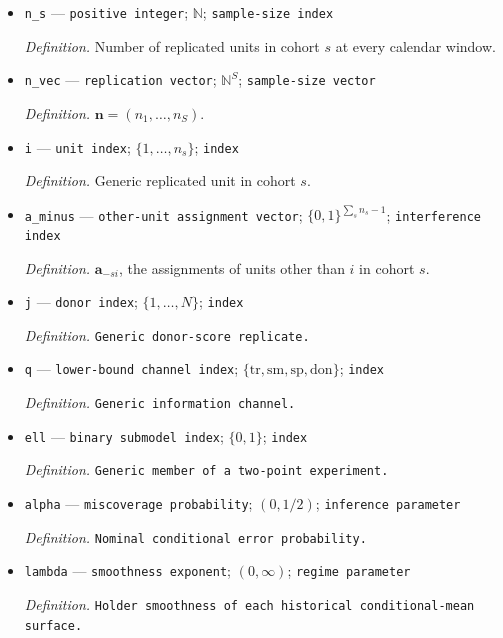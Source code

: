 \documentclass{article}
\begin{document}
\begin{itemize}
  \par\smallskip\noindent\emph{Definition.} \texttt{Untreated or treated event path.}
  \item \texttt{n\_\allowbreak{}s} --- \texttt{positive integer}; \(\mathbb N\); \texttt{sample-\allowbreak{}size index}
  \par\smallskip\noindent\emph{Definition.} Number of replicated units in cohort \(s\) at every calendar window.
  \item \texttt{n\_\allowbreak{}vec} --- \texttt{replication vector}; \(\mathbb N^S\); \texttt{sample-\allowbreak{}size vector}
  \par\smallskip\noindent\emph{Definition.} \(\mathbf n=(n_1,\ldots,n_S)\).
  \item \texttt{i} --- \texttt{unit index}; \(\{1,\ldots,n_s\}\); \texttt{index}
  \par\smallskip\noindent\emph{Definition.} Generic replicated unit in cohort \(s\).
  \item \texttt{a\_\allowbreak{}minus} --- \texttt{other-\allowbreak{}unit assignment vector}; \(\{0,1\}^{\sum_s n_s-1}\); \texttt{interference index}
  \par\smallskip\noindent\emph{Definition.} \(\mathbf a_{-si}\), the assignments of units other than \(i\) in cohort \(s\).
  \item \texttt{j} --- \texttt{donor index}; \(\{1,\ldots,N\}\); \texttt{index}
  \par\smallskip\noindent\emph{Definition.} \texttt{Generic donor-\allowbreak{}score replicate.}
  \item \texttt{q} --- \texttt{lower-\allowbreak{}bound channel index}; \(\{\mathrm{tr},\mathrm{sm},\mathrm{sp},\mathrm{don}\}\); \texttt{index}
  \par\smallskip\noindent\emph{Definition.} \texttt{Generic information channel.}
  \item \texttt{ell} --- \texttt{binary submodel index}; \(\{0,1\}\); \texttt{index}
  \par\smallskip\noindent\emph{Definition.} \texttt{Generic member of a two-\allowbreak{}point experiment.}
  \item \texttt{alpha} --- \texttt{miscoverage probability}; \((0,1/2)\); \texttt{inference parameter}
  \par\smallskip\noindent\emph{Definition.} \texttt{Nominal conditional error probability.}
  \item \texttt{lambda} --- \texttt{smoothness exponent}; \((0,\infty)\); \texttt{regime parameter}
  \par\smallskip\noindent\emph{Definition.} \texttt{Holder smoothness of each historical conditional-\allowbreak{}mean surface.}

\end{itemize}
\end{document}
